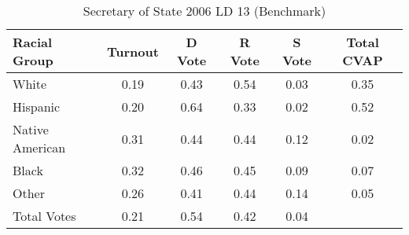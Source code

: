 \begin{table}[htb]
\begin{center}
\caption{Secretary of State 2006 LD 13 (Benchmark)}
\label{sos06_cvap_ld_13_benchmark}
\begin{tabular}{lccccc}
  \hline
Racial Group & Turnout & D Vote & R Vote & S Vote & Total CVAP \\ 
  \hline
White & 0.19 & 0.43 & 0.54 & 0.03 & 0.35 \\ 
  Hispanic & 0.20 & 0.64 & 0.33 & 0.02 & 0.52 \\ 
  Native American & 0.31 & 0.44 & 0.44 & 0.12 & 0.02 \\ 
  Black & 0.32 & 0.46 & 0.45 & 0.09 & 0.07 \\ 
  Other & 0.26 & 0.41 & 0.44 & 0.14 & 0.05 \\ 
  Total Votes & 0.21 & 0.54 & 0.42 & 0.04 &  \\ 
   \hline
\end{tabular}
\end{center}
\end{table}
